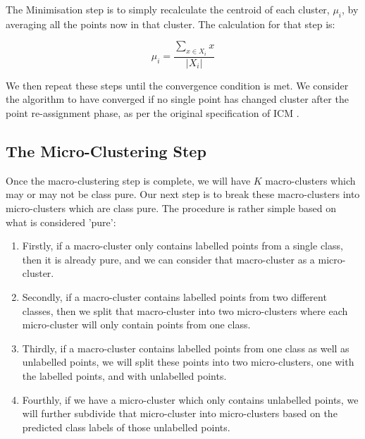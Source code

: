 \documentclass[12pt,a4paper,oneside]{report}
\begin{document}
The Minimisation step is to simply recalculate the centroid of each cluster, \(\mu_i\), by averaging all the points now in that cluster. The calculation for that step is: 

\[\mu_i = \frac{\sum_{x \in X_i}x}{|X_i|}\]

We then repeat these steps until the convergence condition is met. We consider the algorithm to have converged if no single point has changed cluster after the point re-assignment phase, as per the original specification of ICM \cite{ICM}.
 
\subsection*{The Micro-Clustering Step}
 
Once the macro-clustering step is complete, we will have \(K\) macro-clusters which may or may not be class pure. Our next step is to break these macro-clusters into micro-clusters which are class pure. The procedure is rather simple based on what is considered 'pure':

\begin{enumerate}
\item Firstly, if a macro-cluster only contains labelled points from a single class, then it is already pure, and we can consider that macro-cluster as a micro-cluster. 
\item Secondly, if a macro-cluster contains labelled points from two different classes, then we split that macro-cluster into two micro-clusters where each micro-cluster will only contain points from one class. 
\item Thirdly, if a macro-cluster contains labelled points from one class as well as unlabelled points, we will split these points into two micro-clusters, one with the labelled points, and with unlabelled points. 
\item Fourthly, if we have a micro-cluster which only contains unlabelled points, we will further subdivide that micro-cluster into micro-clusters based on the predicted class labels of those unlabelled points.  
\end{enumerate}
\end{document}
